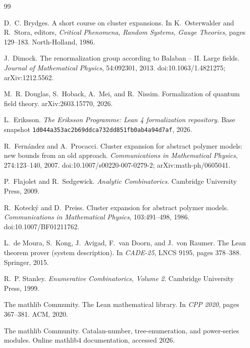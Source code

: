 \documentclass[11pt,a4paper]{article}
\theoremstyle{definition}
\begin{document}
\begin{thebibliography}{99}

D.~C. Brydges.
\newblock A short course on cluster expansions.
\newblock In K.~Osterwalder and R.~Stora, editors, \emph{Critical Phenomena,
Random Systems, Gauge Theories}, pages 129--183. North-Holland, 1986.

J.~Dimock.
\newblock The renormalization group according to Balaban -- II. Large fields.
\newblock \emph{Journal of Mathematical Physics}, 54:092301, 2013.
\newblock doi:10.1063/1.4821275; arXiv:1212.5562.

M.~R. Douglas, S.~Hoback, A.~Mei, and R.~Nissim.
\newblock Formalization of quantum field theory.
\newblock arXiv:2603.15770, 2026.

L.~Eriksson.
\newblock \emph{The Eriksson Programme: Lean 4 formalization repository}.
\newblock Base snapshot \texttt{1d044a353ac2b69ddca732dd851fb0ab4a94d7af}, 2026.

R.~Fern\'andez and A.~Procacci.
\newblock Cluster expansion for abstract polymer models: new bounds from an old approach.
\newblock \emph{Communications in Mathematical Physics}, 274:123--140, 2007.
\newblock doi:10.1007/s00220-007-0279-2; arXiv:math-ph/0605041.

P.~Flajolet and R.~Sedgewick.
\newblock \emph{Analytic Combinatorics}.
\newblock Cambridge University Press, 2009.

R.~Koteck\'y and D.~Preiss.
\newblock Cluster expansion for abstract polymer models.
\newblock \emph{Communications in Mathematical Physics}, 103:491--498, 1986.
\newblock doi:10.1007/BF01211762.

L.~de Moura, S.~Kong, J.~Avigad, F.~van Doorn, and J.~von Raumer.
\newblock The Lean theorem prover (system description).
\newblock In \emph{CADE-25}, LNCS 9195, pages 378--388. Springer, 2015.

R.~P. Stanley.
\newblock \emph{Enumerative Combinatorics, Volume 2}.
\newblock Cambridge University Press, 1999.

The mathlib Community.
\newblock The Lean mathematical library.
\newblock In \emph{CPP 2020}, pages 367--381. ACM, 2020.

The mathlib Community.
\newblock Catalan-number, tree-enumeration, and power-series modules.
\newblock Online mathlib4 documentation, accessed 2026.

\end{thebibliography}
\end{document}
